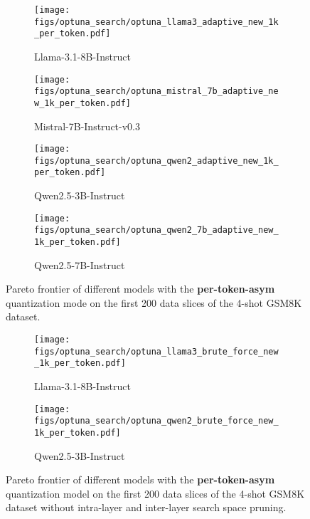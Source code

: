 \begin{figure*}
    \centering
    \begin{subfigure}{0.35\textwidth}
    \texttt{[image: figs/optuna\_search/optuna\_llama3\_adaptive\_new\_1k\_per\_token.pdf]}
    \caption{Llama-3.1-8B-Instruct}
    \label{fig:pareto-frontiers-per-token-asym-gsm8k-limit-200-llama3}
    \end{subfigure}
    \begin{subfigure}{0.35\textwidth}
    \texttt{[image: figs/optuna\_search/optuna\_mistral\_7b\_adaptive\_new\_1k\_per\_token.pdf]}
    \caption{Mistral-7B-Instruct-v0.3}
    \label{fig:pareto-frontiers-per-token-asym-gsm8k-limit-200-mistral}
    \end{subfigure}
    \begin{subfigure}{0.35\textwidth}
    \texttt{[image: figs/optuna\_search/optuna\_qwen2\_adaptive\_new\_1k\_per\_token.pdf]}
    \caption{Qwen2.5-3B-Instruct}
    \label{fig:pareto-frontiers-per-token-asym-gsm8k-limit-200-qwen2.5-3b}
    \end{subfigure}
    \begin{subfigure}{0.35\textwidth}
    \texttt{[image: figs/optuna\_search/optuna\_qwen2\_7b\_adaptive\_new\_1k\_per\_token.pdf]}
    \caption{Qwen2.5-7B-Instruct}
    \label{fig:pareto-frontiers-per-token-asym-gsm8k-limit-200-qwen2.5-7b}
    \end{subfigure}
    \caption{Pareto frontier of different models with the \textbf{per-token-asym} quantization mode on the first 200 data slices of the 4-shot GSM8K dataset.}
\label{fig:pareto-frontiers-per-token-asym-gsm8k-limit-200}
\end{figure*}

\begin{figure*}
    \centering
    \begin{subfigure}{0.35\textwidth}
    \texttt{[image: figs/optuna\_search/optuna\_llama3\_brute\_force\_new\_1k\_per\_token.pdf]}
    \caption{Llama-3.1-8B-Instruct}
    \label{fig:pareto-frontiers-per-token-asym-gsm8k-limit-200-llama3-brute-force}
    \end{subfigure}
    \begin{subfigure}{0.35\textwidth}
    \texttt{[image: figs/optuna\_search/optuna\_qwen2\_brute\_force\_new\_1k\_per\_token.pdf]}
    \caption{Qwen2.5-3B-Instruct}
    \label{fig:pareto-frontiers-per-token-asym-gsm8k-limit-200-mistral-brute-force}
    \end{subfigure}
    \caption{Pareto frontier of different models with the \textbf{per-token-asym} quantization model on the first 200 data slices of the 4-shot GSM8K dataset without intra-layer and inter-layer search space pruning.}
\label{fig:pareto-frontiers-per-token-asym-gsm8k-limit-200-brute-force}
\end{figure*}

